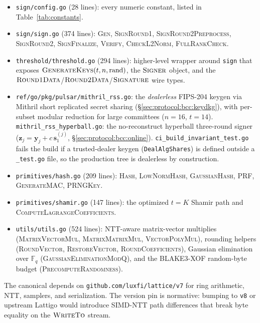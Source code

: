 \begin{itemize}
\item \texttt{sign/config.go} (28 lines): every numeric constant, listed in Table~\ref{tab:constants}.
\item \texttt{sign/sign.go} (374 lines): \textsc{Gen}, \textsc{SignRound1}, \textsc{SignRound2Preprocess}, \textsc{SignRound2}, \textsc{SignFinalize}, \textsc{Verify}, \textsc{CheckL2Norm}, \textsc{FullRankCheck}.
\item \texttt{threshold/threshold.go} (294 lines): higher-level wrapper around \texttt{sign} that exposes $\textsc{GenerateKeys}(t, n, \mathrm{rand})$, the $\textsc{Signer}$ object, and the $\textsc{Round1Data}$/$\textsc{Round2Data}$/$\textsc{Signature}$ wire types.
\item \texttt{ref/go/pkg/pulsar/mithril\_rss.go}: the \emph{dealerless} FIPS-204 keygen via Mithril short replicated secret sharing (\S\ref{sec:protocol:bcc:keydkg}), with per-subset modular reduction for large committees ($n{=}16$, $t{=}14$). \texttt{mithril\_rss\_hyperball.go}: the no-reconstruct hyperball three-round signer ($\mathbf{z}_j = \mathbf{y}_j + c\,\mathbf{s}_1^{(j)}$, \S\ref{sec:protocol:bcc:online}). \texttt{ci\_build\_invariant\_test.go} fails the build if a trusted-dealer keygen (\texttt{DealAlgShares}) is defined outside a \texttt{\_test.go} file, so the production tree is dealerless by construction.
\item \texttt{primitives/hash.go} (209 lines): \textsc{Hash}, \textsc{LowNormHash}, \textsc{GaussianHash}, \textsc{PRF}, \textsc{GenerateMAC}, \textsc{PRNGKey}.
\item \texttt{primitives/shamir.go} (147 lines): the optimized $t = K$ Shamir path and \textsc{ComputeLagrangeCoefficients}.
\item \texttt{utils/utils.go} (524 lines): NTT-aware matrix-vector multiplies (\textsc{MatrixVectorMul}, \textsc{MatrixMatrixMul}, \textsc{VectorPolyMul}), rounding helpers (\textsc{RoundVector}, \textsc{RestoreVector}, \textsc{RoundCoefficients}), Gaussian elimination over $\mathbb{F}_q$ (\textsc{GaussianEliminationModQ}), and the BLAKE3-XOF random-byte budget (\textsc{PrecomputeRandomness}).
\end{itemize}

The canonical depends on \texttt{github.com/luxfi/lattice/v7} \cite{lattigov7} for ring arithmetic, NTT, samplers, and serialization. The version pin is normative: bumping to \texttt{v8} or upstream Lattigo would introduce SIMD-NTT path differences that break byte equality on the $\textsc{WriteTo}$ stream.

